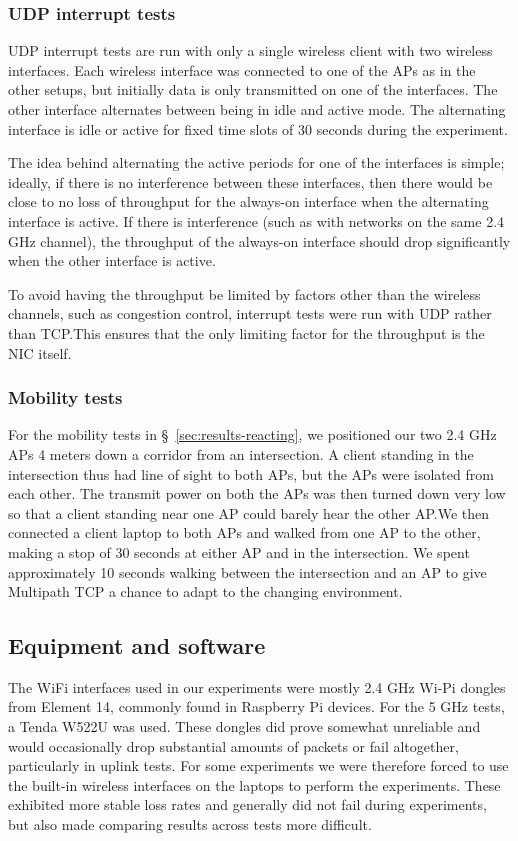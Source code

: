 \subsubsection{UDP interrupt tests}
\label{sec:met:setups:intudp}
UDP interrupt tests are run with only a single wireless client with two wireless
interfaces. Each wireless interface was connected to one of the APs as in the
other setups, but initially data is only transmitted on one of the interfaces.
The other interface alternates between being in idle and active mode. The
alternating interface is idle or active for fixed time slots of 30 seconds
during the experiment.

The idea behind alternating the active periods for one of the interfaces is
simple; ideally, if there is no interference between these interfaces, then
there would be close to no loss of throughput for the always-on interface when
the alternating interface is active. If there is interference (such as with
networks on the same 2.4 GHz channel), the throughput of the always-on interface
should drop significantly when the other interface is active.

To avoid having the throughput be limited by factors other than the wireless
channels, such as congestion control, interrupt tests were run with UDP rather
than TCP.\@ This ensures that the only limiting factor for the throughput is the
NIC itself.

\subsubsection{Mobility tests}
\label{sec:met:setups:mobility}
For the mobility tests in \S~\ref{sec:results-reacting}, we positioned our two
2.4 GHz APs 4 meters down a corridor from an intersection. A client standing in
the intersection thus had line of sight to both APs, but the APs were isolated
from each other. The transmit power on both the APs was then turned down very
low so that a client standing near one AP could barely hear the other AP.\@ We
then connected a client laptop to both APs and walked from one AP to the other,
making a stop of 30 seconds at either AP and in the intersection. We spent
approximately 10 seconds walking between the intersection and an AP to give
Multipath TCP a chance to adapt to the changing environment.

\subsection{Equipment and software}
\label{sec:met:equip}
The WiFi interfaces used in our experiments were mostly 2.4 GHz Wi-Pi dongles
from Element 14, commonly found in Raspberry Pi devices. For the 5 GHz tests, a
Tenda W522U was used. These dongles did prove somewhat unreliable and would
occasionally drop substantial amounts of packets or fail altogether,
particularly in uplink tests.  For some experiments we were therefore forced to
use the built-in wireless interfaces on the laptops to perform the experiments.
These exhibited more stable loss rates and generally did not fail during
experiments, but also made comparing results across tests more difficult.

